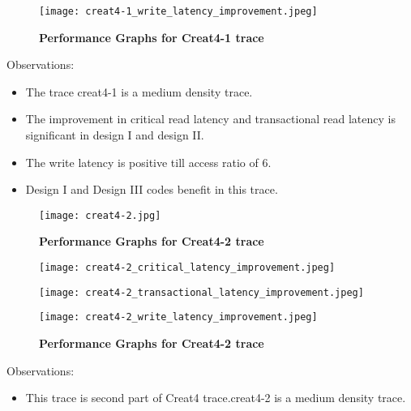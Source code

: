 \begin{landscape}
\begin{figure}[htb]
\begin{minipage}[!t]{0.33\linewidth}
        \texttt{[image: creat4-1\_write\_latency\_improvement.jpeg]}
\end{minipage}
\caption{
{\bf Performance Graphs for Creat4-1 trace} }
\label{fig:creat41_improvement}
\end{figure}
Observations:
\begin{itemize}
	\item The trace creat4-1 is a medium density trace. 
	\item The improvement in critical read latency and transactional read latency is significant in design I and design II. 
	\item The write latency is positive till access ratio of 6.
	\item Design I and Design III codes benefit in this trace.
\end{itemize}
\cleardoublepage
\begin{figure}[htb]
\begin{minipage}[!t]{\linewidth}
        \texttt{[image: creat4-2.jpg]}
\end{minipage}
\caption{
{\bf Performance Graphs for Creat4-2 trace} }
\label{fig:creat42}
\end{figure}
\cleardoublepage
\begin{figure}[htb]
\begin{minipage}[!t]{0.33\linewidth}
        \texttt{[image: creat4-2\_critical\_latency\_improvement.jpeg]}
\end{minipage}
\begin{minipage}[!t]{0.33\linewidth}
        \texttt{[image: creat4-2\_transactional\_latency\_improvement.jpeg]}
\end{minipage}
\begin{minipage}[!t]{0.33\linewidth}
        \texttt{[image: creat4-2\_write\_latency\_improvement.jpeg]}
\end{minipage}
\caption{
{\bf Performance Graphs for Creat4-2 trace} }
\label{fig:creat42_improvement}
\end{figure}
Observations:
\begin{itemize}
	\item This trace is second part of Creat4 trace.creat4-2 is a medium density trace. 

\end{itemize}
\end{landscape}
